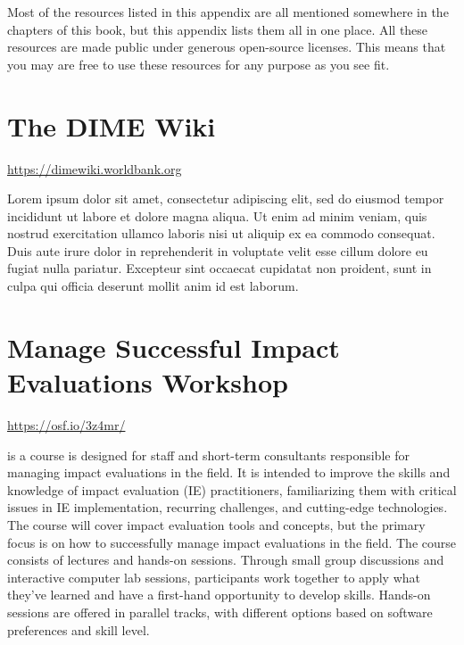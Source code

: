 
\begin{fullwidth}

Most of the resources listed in this appendix are all mentioned somewhere in
the chapters of this book, but this appendix lists them all in one place. All
these resources are made public under generous open-source licenses. This means
that you may are free to use these resources for any purpose as you see fit.

\end{fullwidth}


\filbreak
\section{The DIME Wiki}
\url{https://dimewiki.worldbank.org}
\vspace{\baselineskip}

\noindent Lorem ipsum dolor sit amet, consectetur adipiscing elit, sed do eiusmod tempor incididunt ut labore et dolore magna aliqua. Ut enim ad minim veniam, quis nostrud exercitation ullamco laboris nisi ut aliquip ex ea commodo consequat. Duis aute irure dolor in reprehenderit in voluptate velit esse cillum dolore eu fugiat nulla pariatur. Excepteur sint occaecat cupidatat non proident, sunt in culpa qui officia deserunt mollit anim id est laborum.


\filbreak
\section{Manage Successful Impact Evaluations Workshop}
\url{https://osf.io/3z4mr/}
\vspace{\baselineskip}

\noindentMSIE is a course is designed for staff and short-term consultants responsible for managing impact evaluations in the field. It is intended to improve the skills and knowledge of impact evaluation (IE) practitioners, familiarizing them with critical issues in IE implementation, recurring challenges, and cutting-edge technologies. The course will cover impact evaluation tools and concepts, but the primary focus is on how to successfully manage impact evaluations in the field. The course consists of lectures and hands-on sessions. Through small group discussions and interactive computer lab sessions, participants work together to apply what they’ve learned and have a first-hand opportunity to develop skills. Hands-on sessions are offered in parallel tracks, with different options based on software preferences and skill level.


